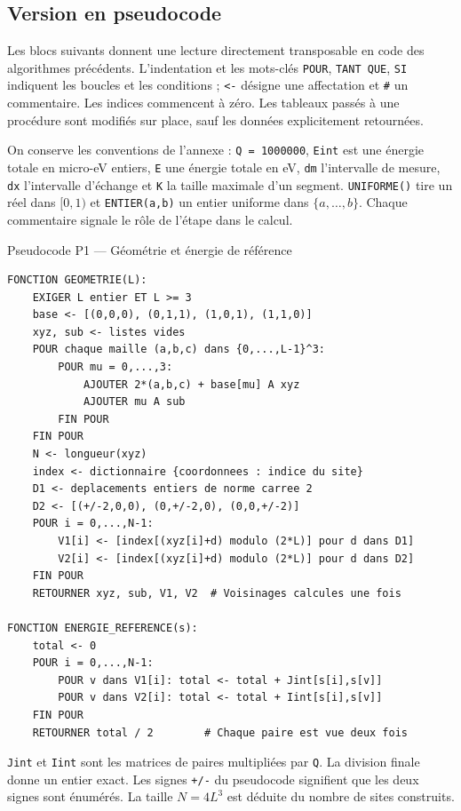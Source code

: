 \documentclass[10pt,a4paper]{article}
\begin{document}
\clearpage
\subsection{Version en pseudocode}
\label{sec:pseudocode}
Les blocs suivants donnent une lecture directement transposable en code
des algorithmes précédents. L'indentation et les mots-clés
\texttt{POUR}, \texttt{TANT QUE}, \texttt{SI} indiquent les boucles et les
conditions ; \texttt{<-} désigne une affectation et \texttt{\#} un commentaire.
Les indices commencent à zéro. Les tableaux passés à une procédure sont
modifiés sur place, sauf les données explicitement retournées.

On conserve les conventions de l'annexe : \texttt{Q = 1000000},
\texttt{Eint} est une énergie totale en micro-eV entiers, \texttt{E} une
énergie totale en eV, \texttt{dm} l'intervalle de mesure, \texttt{dx}
l'intervalle d'échange et \texttt{K} la taille maximale d'un segment.
\texttt{UNIFORME()} tire un réel dans $[0,1)$ et
\texttt{ENTIER(a,b)} un entier uniforme dans $\{a,\ldots,b\}$.
Chaque commentaire signale le rôle de l'étape dans le calcul.

\begin{algocode}{Pseudocode P1 --- Géométrie et énergie de référence}
\small
\begin{verbatim}
FONCTION GEOMETRIE(L):
    EXIGER L entier ET L >= 3
    base <- [(0,0,0), (0,1,1), (1,0,1), (1,1,0)]
    xyz, sub <- listes vides
    POUR chaque maille (a,b,c) dans {0,...,L-1}^3:
        POUR mu = 0,...,3:
            AJOUTER 2*(a,b,c) + base[mu] A xyz
            AJOUTER mu A sub
        FIN POUR
    FIN POUR
    N <- longueur(xyz)
    index <- dictionnaire {coordonnees : indice du site}
    D1 <- deplacements entiers de norme carree 2
    D2 <- [(+/-2,0,0), (0,+/-2,0), (0,0,+/-2)]
    POUR i = 0,...,N-1:
        V1[i] <- [index[(xyz[i]+d) modulo (2*L)] pour d dans D1]
        V2[i] <- [index[(xyz[i]+d) modulo (2*L)] pour d dans D2]
    FIN POUR
    RETOURNER xyz, sub, V1, V2  # Voisinages calcules une fois

FONCTION ENERGIE_REFERENCE(s):
    total <- 0
    POUR i = 0,...,N-1:
        POUR v dans V1[i]: total <- total + Jint[s[i],s[v]]
        POUR v dans V2[i]: total <- total + Iint[s[i],s[v]]
    FIN POUR
    RETOURNER total / 2        # Chaque paire est vue deux fois
\end{verbatim}
\end{algocode}

\texttt{Jint} et \texttt{Iint} sont les matrices de paires multipliées par
\texttt{Q}. La division finale donne un entier exact. Les signes
\texttt{+/-} du pseudocode signifient que les deux signes sont énumérés.
La taille $N=4L^3$ est déduite du nombre de sites construits.
\end{document}
